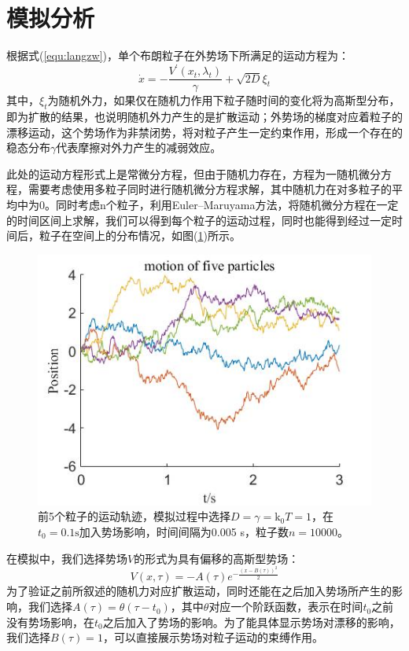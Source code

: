 \section{模拟分析}
根据式(\ref{equ:langzw})，单个布朗粒子在外势场下所满足的运动方程为：
$$
\dot{x}=-\frac{V^\prime\left( x_t,\lambda _t \right)}{\gamma}+\sqrt{2D}\xi _t
$$
其中，$\xi_t$为随机外力，如果仅在随机力作用下粒子随时间的变化将为高斯型分布，即为扩散的结果，也说明随机外力产生的是扩散运动；外势场的梯度对应着粒子的漂移运动，这个势场作为非禁闭势，将对粒子产生一定约束作用，形成一个存在的稳态分布$\gamma$代表摩擦对外力产生的减弱效应。

此处的运动方程形式上是常微分方程，但由于随机力存在，方程为一随机微分方程，需要考虑使用多粒子同时进行随机微分方程求解，其中随机力在对多粒子的平均中为0。同时考虑n个粒子，利用Euler–Maruyama方法\cite{vomscheidtKloedenPEPlaten1994}，将随机微分方程在一定的时间区间上求解，我们可以得到每个粒子的运动过程，同时也能得到经过一定时间后，粒子在空间上的分布情况，如图(\ref{fig:sim-coordinate})所示。

\begin{figure}[H]
    \centering
    \includegraphics[width=0.8\linewidth]{figs/粒子坐标.jpg}
    \caption{前5个粒子的运动轨迹，模拟过程中选择$D=\gamma=\mathrm{k}_{0}T=1$，在$t_0=0.1 \text{s}$加入势场影响，时间间隔为0.005 s，粒子数$n=10000$。}
    \label{fig:sim-coordinate}
\end{figure}

在模拟中，我们选择势场$V$的形式为具有偏移的高斯型势场：
\begin{equation}
    V\left( x,\tau \right) =-A\left( \tau \right) e^{-\frac{\left( x-B\left( \tau \right) \right) ^2}{2}}
\end{equation}
为了验证之前所叙述的随机力对应扩散运动，同时还能在之后加入势场所产生的影响，我们选择$A(\tau)=\theta(\tau-t_0)$，其中$\theta$对应一个阶跃函数，表示在时间$t_0$之前没有势场影响，在$t_0$之后加入了势场的影响。为了能具体显示势场对漂移的影响，我们选择$B(\tau)=1$，可以直接展示势场对粒子运动的束缚作用。

